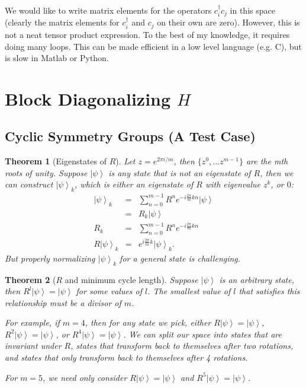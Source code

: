 \documentclass{article}
\newcommand{\ket}[1]{\left| #1 \right>} %
\newtheorem{theorem}{Theorem}[section]
\theoremstyle{definition}
\begin{document}
We would like to write matrix elements for the operators $c^\dag_i c_j$ in this space (clearly the matrix elements for $c^\dag_i$ and $c_j$ on their own are zero). However, this is not a neat tensor product expression. To the best of my knowledge, it requires doing many loops. This can be made efficient in a low level language (e.g. C), but is slow in Matlab or Python.


\section{Block Diagonalizing $H$}

\subsection{Cyclic Symmetry Groups (A Test Case)}

\begin{theorem}[Eigenstates of $R$]
\label{cyclic-eigenstates}
Let $z = e^{2\pi i/m}$, then $\{z^0,...z^{m-1}\}$ are the mth roots of unity. Suppose $\ket{\psi}$ is any state that is not an eigenstate of $R$, then we can construct $\ket{\psi}_k$, which is either an eigenstate of $R$ with eigenvalue $z^k$, or $0$: 
\begin{eqnarray}
\ket{\psi}_k &=& \sum_{n=0}^{m-1} R^n e^{-i \frac{2\pi}{m}kn} \ket{\psi} \\
&=& R_k \ket{\psi}\\
R_k &=& \sum_{n=0}^{m-1} R^n e^{-i \frac{2\pi}{m}kn}\\
R \ket{\psi}_k &=& e^{i \frac{2\pi}{m}k} \ket{\psi}_k.
\end{eqnarray}
But properly normalizing $\ket{\psi}_k$ for a general state is challenging.
\end{theorem}

\begin{theorem}[$R$ and minimum cycle length]
Suppose $\ket{\psi}$ is an arbitrary state, then $R^l \ket{\psi} = \ket{\psi}$ for some values of $l$. The smallest value of $l$ that satisfies this relationship must be a divisor of $m$. 

For example, if $m=4$, then for any state we pick, either $R \ket{\psi} = \ket{\psi}$, $R^2 \ket{\psi} =   \ket{\psi}$, or $R^4 \ket{\psi} = \ket{\psi}$. We can split our space into states that are invariant under $R$, states that transform back to themselves after two rotations, and states that only transform back to themselves after 4 rotations.

For $m=5$, we need only consider $R \ket{\psi} = \ket{\psi}$ and $R^5 \ket{\psi} =   \ket{\psi}$.
\end{theorem}
\end{document}
